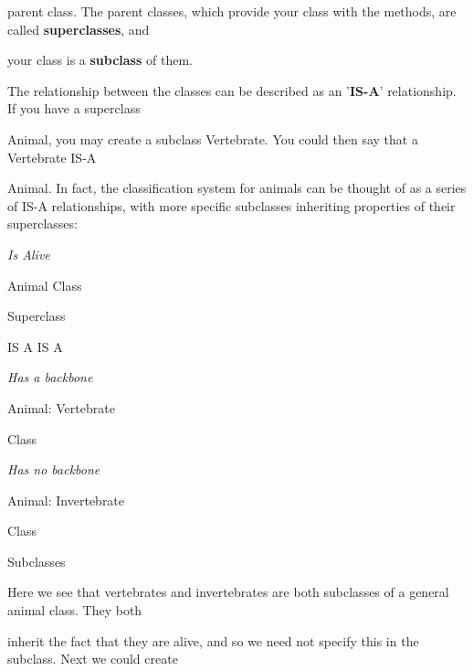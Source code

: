 \documentclass[a4paper,11pt]{book}
\begin{document}
\noindent parent class. The parent classes, which provide your class with the methods, are called \textbf{superclasses}, and

\noindent your class is a \textbf{subclass }of them.

\noindent 

\noindent The relationship between the classes can be described as an '\textbf{IS-A}' relationship. If you have a superclass

\noindent Animal, you may create a subclass Vertebrate. You could then say that a Vertebrate IS-A

\noindent Animal. In fact, the classification system for animals can be thought of as a series of IS-A relationships, with more specific subclasses inheriting properties of their superclasses:

\noindent 

\noindent 

\noindent \textit{Is Alive}

\noindent 

\noindent Animal Class

\noindent 

\noindent Superclass

\noindent 

\noindent 

\noindent 

\noindent IS A IS A

\noindent 

\noindent \textit{Has a backbone}

\noindent 

\noindent Animal: Vertebrate

\noindent Class

\noindent \textit{Has no backbone}

\noindent 

\noindent Animal: Invertebrate

\noindent Class

\noindent 

\noindent 

\noindent Subclasses

\noindent 

\noindent 

\noindent Here we see that vertebrates and invertebrates are both subclasses of a general animal class. They both

\noindent inherit the fact that they are alive, and so we need not specify this in the subclass. Next we could create
\end{document}
